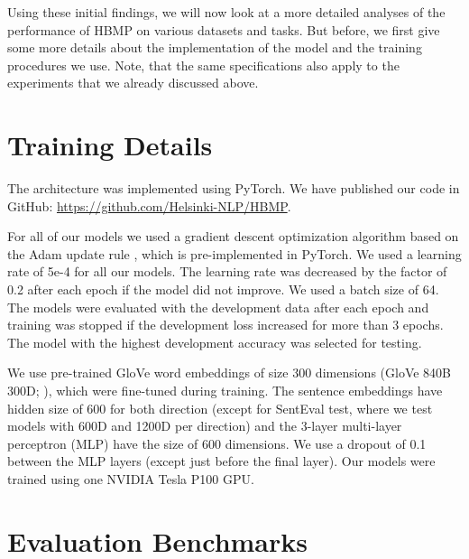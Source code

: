 \documentclass{nle}
\begin{document}
Using these initial findings, we will now look at a more detailed analyses of the performance of HBMP on various datasets and tasks. But before, we first give some more details about the implementation of the model and the training procedures we use. Note, that the same specifications also apply to the experiments that we already discussed above.

\section{Training Details}

The architecture was implemented using PyTorch. We have published our code in GitHub: \url{https://github.com/Helsinki-NLP/HBMP}.

For all of our models we used a gradient descent optimization algorithm based on the Adam update rule \citep{KingmaB14Adam}, which is pre-implemented in PyTorch. We used a learning rate of 5e-4 for all our models. The learning rate was decreased by the factor of 0.2 after each epoch if the model did not improve. We used a batch size of 64. The models were evaluated with the development data after each epoch and training was stopped if the development loss increased for more than 3 epochs. The model with the highest development accuracy was selected for testing.

We use pre-trained GloVe word embeddings of size 300 dimensions (GloVe 840B 300D; \citealp{pennington2014glove}), which were fine-tuned during training. The sentence embeddings have hidden size of 600 for both direction (except for SentEval test, where we test models with 600D and 1200D per direction) and the 3-layer multi-layer perceptron (MLP) have the size of 600 dimensions. We use a dropout of 0.1 between the MLP layers (except just before the final layer). Our models were trained using one NVIDIA Tesla P100 GPU.




\section{Evaluation Benchmarks}
\label{sec:setup}
\end{document}
